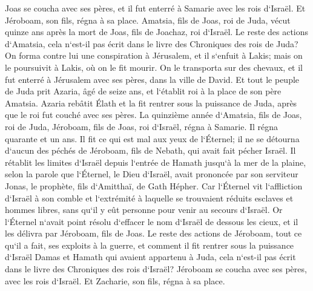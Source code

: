 \verse Joas se coucha avec ses pères, et il fut enterré à Samarie avec les rois d`Israël. Et Jéroboam, son fils, régna à sa place. 
\verse Amatsia, fils de Joas, roi de Juda, vécut quinze ans après la mort de Joas, fils de Joachaz, roi d`Israël. 
\verse Le reste des actions d`Amatsia, cela n`est-il pas écrit dans le livre des Chroniques des rois de Juda? 
\verse On forma contre lui une conspiration à Jérusalem, et il s`enfuit à Lakis; mais on le poursuivit à Lakis, où on le fit mourir. 
\verse On le transporta sur des chevaux, et il fut enterré à Jérusalem avec ses pères, dans la ville de David. 
\verse Et tout le peuple de Juda prit Azaria, âgé de seize ans, et l`établit roi à la place de son père Amatsia. 
\verse Azaria rebâtit Élath et la fit rentrer sous la puissance de Juda, après que le roi fut couché avec ses pères. 
\verse La quinzième année d`Amatsia, fils de Joas, roi de Juda, Jéroboam, fils de Joas, roi d`Israël, régna à Samarie. Il régna quarante et un ans. 
\verse Il fit ce qui est mal aux yeux de l`Éternel; il ne se détourna d`aucun des péchés de Jéroboam, fils de Nebath, qui avait fait pécher Israël. 
\verse Il rétablit les limites d`Israël depuis l`entrée de Hamath jusqu`à la mer de la plaine, selon la parole que l`Éternel, le Dieu d`Israël, avait prononcée par son serviteur Jonas, le prophète, fils d`Amitthaï, de Gath Hépher. 
\verse Car l`Éternel vit l`affliction d`Israël à son comble et l`extrémité à laquelle se trouvaient réduits esclaves et hommes libres, sans qu`il y eût personne pour venir au secours d`Israël. 
\verse Or l`Éternel n`avait point résolu d`effacer le nom d`Israël de dessous les cieux, et il les délivra par Jéroboam, fils de Joas. 
\verse Le reste des actions de Jéroboam, tout ce qu`il a fait, ses exploits à la guerre, et comment il fit rentrer sous la puissance d`Israël Damas et Hamath qui avaient appartenu à Juda, cela n`est-il pas écrit dans le livre des Chroniques des rois d`Israël? 
\verse Jéroboam se coucha avec ses pères, avec les rois d`Israël. Et Zacharie, son fils, régna à sa place. 

